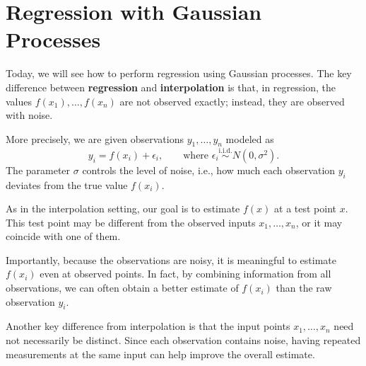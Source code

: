 \documentclass{scrartcl}
\begin{document}
\section{Regression with Gaussian Processes}

Today, we will see how to perform regression using Gaussian processes.  
The key difference between \textbf{regression} and \textbf{interpolation} is that, in regression, the values \( f(x_1), \dots, f(x_n) \) are not observed exactly; instead, they are observed with noise.

More precisely, we are given observations \( y_1, \dots, y_n \) modeled as
\[
y_i = f(x_i) + \epsilon_i, \qquad \text{where } \epsilon_i \overset{\text{i.i.d.}}{\sim} N(0, \sigma^2).
\]
The parameter \( \sigma \) controls the level of noise, i.e., how much each observation \( y_i \) deviates from the true value \( f(x_i) \).

As in the interpolation setting, our goal is to estimate \( f(x) \) at a test point \( x \). This test point may be different from the observed inputs \( x_1, \dots, x_n \), or it may coincide with one of them.

Importantly, because the observations are noisy, it is meaningful to estimate \( f(x_i) \) even at observed points. In fact, by combining information from all observations, we can often obtain a better estimate of \( f(x_i) \) than the raw observation \( y_i \).

Another key difference from interpolation is that the input points \(
x_1, \dots, x_n \) need not necessarily be distinct. Since each observation
contains noise, having repeated measurements at the same input can
help improve the overall estimate.
\end{document}
